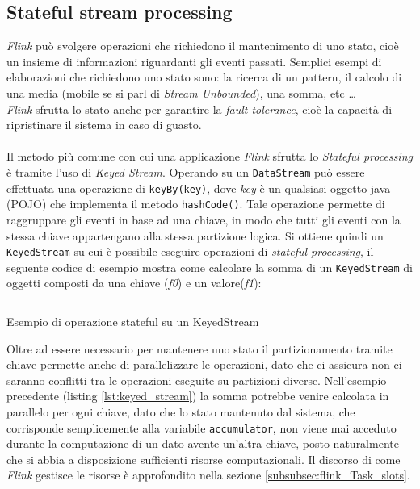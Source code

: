 \subsection{Stateful stream processing}
\label{subsec:flink_statefull_processing}
\textit{Flink} può svolgere operazioni che richiedono il mantenimento di uno stato, cioè un insieme di informazioni riguardanti gli eventi passati.
Semplici esempi di elaborazioni che richiedono uno stato sono: la ricerca di un pattern, il calcolo di una media (mobile se si parl di \textit{Stream Unbounded}), una somma, etc \dots\\
\textit{Flink} sfrutta lo stato anche per garantire la \textit{fault-tolerance}, cioè la capacità di ripristinare il sistema in caso di guasto.\\\\
Il metodo più comune con cui una applicazione \textit{Flink} sfrutta lo \textit{Stateful processing} è tramite l'uso di \textit{Keyed Stream}.
Operando su un \texttt{DataStream} può essere effettuata una operazione di \texttt{keyBy(key)}, dove \textit{key} è un qualsiasi oggetto java (POJO) che implementa il metodo \texttt{hashCode()}.
Tale operazione permette di raggruppare gli eventi in base ad una chiave, in modo che tutti gli eventi con la stessa chiave appartengano alla stessa partizione logica.
Si ottiene quindi un \texttt{KeyedStream} su cui è possibile eseguire operazioni di \textit{stateful processing}, 
il seguente codice di esempio mostra come calcolare la somma di un \texttt{KeyedStream} di oggetti composti da una chiave (\textit{f0}) e un valore(\textit{f1}):\\
\begin{code}
    \inputminted{java}{listings/keyed-stream.java}
    \caption{Esempio di operazione stateful su un KeyedStream}
    \label{lst:keyed_stream}
\end{code}
Oltre ad essere necessario per mantenere uno stato il partizionamento tramite chiave permette anche di parallelizzare le operazioni, 
dato che ci assicura non ci saranno conflitti tra le operazioni eseguite su partizioni diverse.
Nell'esempio precedente (listing \ref{lst:keyed_stream}) la somma potrebbe venire calcolata in parallelo per ogni chiave, dato che lo stato mantenuto dal sistema,
che corrisponde semplicemente alla variabile \texttt{accumulator}, non viene mai acceduto durante la computazione di un dato avente un'altra chiave, posto naturalmente che si abbia a disposizione sufficienti risorse computazionali.
Il discorso di come \textit{Flink} gestisce le risorse è approfondito nella sezione \ref{subsubsec:flink_Task_slots}.

